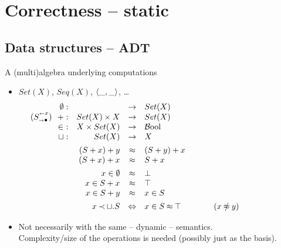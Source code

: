 \documentclass[leqno]{article}
\begin{document}
\newpage
\section{Correctness -- static}
\subsection{Data structures -- ADT}
A (multi)algebra  underlying computations
\begin{itemize}
\item $Set(X)$, $Seq(X)$, $\langle\_,\_\rangle$, \ldots 
\[ \hspace*{-3em}\begin{array}{l@{\hspace*{3em}}l}
\begin{array}[t]{rrcl}
\es : & & \into & Set(X) \\
(\add Sx)\ \ + : & Set(X)\times X & \into & Set(X) \\
\in\ : & X \times Set(X) & \into & \bool \\
\ch: & Set(X) & \into & X \\[1ex]
\multicolumn{2}{r} { (S+x)+y } & \Eq & (S+y)+x \\
\multicolumn{2}{r}{ (S+x)+x } & \Eq & S+x \\[1ex]
\multicolumn{2}{r}{ x\in\es } & \Eq & \false \\
\multicolumn{2}{r}{ x\in S+x } & \Eq & \true \\
\multicolumn{2}{r}{ x\in S+y }& \Eq & x\in S \\[1ex]
\multicolumn{2}{r}{ x\Incl \ch.S} & \Iff & x\in S\Eq\true 
\hspace*{4em} (x\notEq y)
\end{array}
&
\end{array}
\]
%
\item
Not necessarily with the same -- dynamic -- semantics. \\
Complexity/size of the operations is needed (possibly just as the basis).
\end{itemize}
\end{document}
